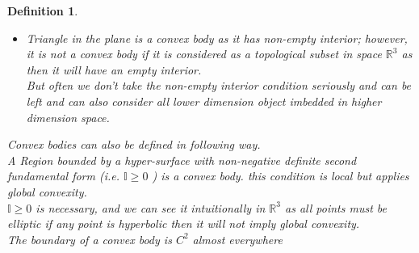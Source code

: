 \documentclass[oneside]{book}
\newtheorem{mydef}{Definition}
\begin{document}
\begin{mydef}
\begin{itemize}
       Convex Polytope in $\mathbb{R}^n$ are Convex Body but polyhedron is not as it need not be compact because it may be unbounded.
    \item 
Triangle in the plane is a convex body as it has non-empty interior; however, it is not a convex body if it is considered as a topological subset in space  $\mathbb{R}^3$ as then it will have an empty interior. 
\\  
But often we don't take the non-empty interior condition seriously and can be left and can also consider all lower dimension object imbedded in higher dimension space.


\end{itemize}
 
Convex bodies can also be defined in following way.\\
     A Region  bounded by a hyper-surface with non-negative definite second fundamental form (i.e. $\mathbb{I} \geq 0 $ ) is a convex body. this condition is local but  applies global convexity. \\
     $\mathbb{I} \geq 0 $ is necessary, and we can see it intuitionally in  $\mathbb{R}^3$ as all points must be elliptic if any point is hyperbolic then it will not imply global convexity. \\
     The boundary of a convex body is $C^{2}$ almost everywhere   \\\\
     
     
 
 
 
 
 
 
 

\end{mydef}
\end{document}
